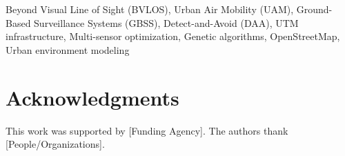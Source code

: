 \documentclass[conference]{IEEEtran}
\begin{document}
\begin{IEEEkeywords}
Beyond Visual Line of Sight (BVLOS), Urban Air Mobility (UAM), Ground-Based Surveillance Systems (GBSS), Detect-and-Avoid (DAA), UTM infrastructure, Multi-sensor optimization, Genetic algorithms, OpenStreetMap, Urban environment modeling
\end{IEEEkeywords}











\section*{Acknowledgments}
This work was supported by [Funding Agency]. The authors thank [People/Organizations].



\end{document}

